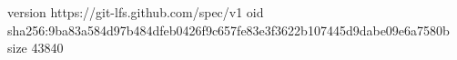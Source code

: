 version https://git-lfs.github.com/spec/v1
oid sha256:9ba83a584d97b484dfeb0426f9c657fe83e3f3622b107445d9dabe09e6a7580b
size 43840
